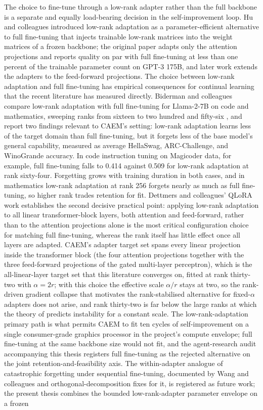 The choice to fine-tune through a low-rank adapter rather than the full backbone is a separate and equally load-bearing decision in the self-improvement loop. Hu and colleagues introduced low-rank adaptation \cite{hu2022lora} as a parameter-efficient alternative to full fine-tuning that injects trainable low-rank matrices into the weight matrices of a frozen backbone; the original paper adapts only the attention projections and reports quality on par with full fine-tuning at less than one percent of the trainable parameter count on GPT-3 175B, and later work extends the adapters to the feed-forward projections. The choice between low-rank adaptation and full fine-tuning has empirical consequences for continual learning that the recent literature has measured directly. Biderman and colleagues compare low-rank adaptation with full fine-tuning for Llama-2-7B on code and mathematics, sweeping ranks from sixteen to two hundred and fifty-six \cite{biderman2024lora}, and report two findings relevant to CAEM's setting: low-rank adaptation learns less of the target domain than full fine-tuning, but it forgets less of the base model's general capability, measured as average HellaSwag, ARC-Challenge, and WinoGrande accuracy. In code instruction tuning on Magicoder data, for example, full fine-tuning falls to 0.414 against 0.509 for low-rank adaptation at rank sixty-four. Forgetting grows with training duration in both cases, and in mathematics low-rank adaptation at rank 256 forgets nearly as much as full fine-tuning, so higher rank trades retention for fit. Dettmers and colleagues' QLoRA work \cite{dettmers2023qlora} establishes the second decisive practical point: applying low-rank adaptation to all linear transformer-block layers, both attention and feed-forward, rather than to the attention projections alone is the most critical configuration choice for matching full fine-tuning, whereas the rank itself has little effect once all layers are adapted. CAEM's adapter target set spans every linear projection inside the transformer block (the four attention projections together with the three feed-forward projections of the gated multi-layer perceptron), which is the all-linear-layer target set that this literature converges on, fitted at rank thirty-two with $\alpha=2r$; with this choice the effective scale $\alpha/r$ stays at two, so the rank-driven gradient collapse that motivates the rank-stabilised alternative for fixed-$\alpha$ adapters does not arise, and rank thirty-two is far below the large ranks at which the theory of \cite{kalajdzievski2023rslora} predicts instability for a constant scale. The low-rank-adaptation primary path is what permits CAEM to fit ten cycles of self-improvement on a single consumer-grade graphics processor in the project's compute envelope; full fine-tuning at the same backbone size would not fit, and the agent-research audit accompanying this thesis registers full fine-tuning as the rejected alternative on the joint retention-and-feasibility axis. The within-adapter analogue of catastrophic forgetting under sequential fine-tuning, documented by Wang and colleagues \cite{wang2023olora} and orthogonal-decomposition fixes for it, is registered as future work; the present thesis combines the bounded low-rank-adapter parameter envelope on a frozen 